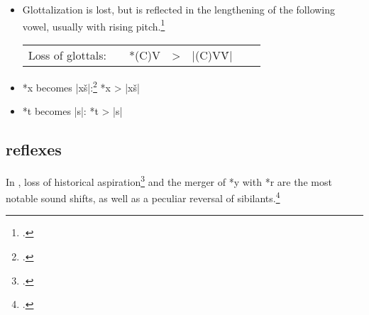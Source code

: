 \documentclass[output=paper]{LSP/langsci}
\begin{document}
\begin{itemize}
\item Glottalization is lost, but is reflected in the lengthening of the following vowel, usually with rising pitch.\footnote{\citealt[232]{Rankinetal2006PDF}.}



\begin{tabular}[t]{c c c c c c c}
Loss of glottals:	 & & *(C)\textsuperscript{\textipa{P}}V & > & |(C)V\'V|
\end{tabular}

\item *x becomes |xš|:\footnote{	\citealt[124]{Rankinetal2006PDF}.}	\hspace{1em} *x	>	|xš|
\item *t becomes |s|: \hspace{2em}  *t	>	|s|
\end{itemize}

\subsection{ reflexes}

In , loss of historical aspiration\footnote{\citealt[50]{Rankinetal2006PDF}.} and the merger of *y with *r are the most notable sound shifts, as well as a peculiar reversal of sibilants.\footnote{\citealt[126]{Rankinetal2006PDF}.}
\end{document}

